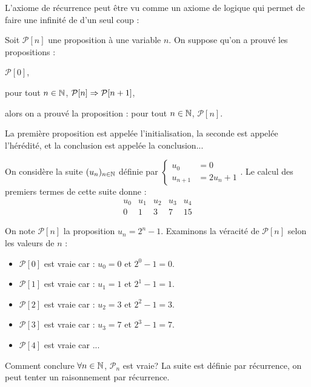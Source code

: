 \documentclass[a4paper,11pt,DIV20,BCOR0mm]{scrartcl}
\begin{document}
L'axiome de récurrence peut être vu comme un axiome de logique qui permet de faire une infinité de 
d'un seul coup :

\begin{axiome}
Soit $\mathcal{P}[n]$ une proposition à une variable $n$.
On suppose qu'on a prouvé les propositions :
\begin{description}
 \item $\mathcal{P}[0]$,
 \item pour tout $n\in\mathbb{N}$, $\mathcal{P}[n]\Rightarrow\mathcal{P}[n+1]$,
\end{description}
alors on a prouvé la proposition : \og pour tout $n\in\mathbb{N}$, $\mathcal{P}[n]$\fg.
\end{axiome}
La première proposition est appelée l'initialisation, la seconde est appelée l'hérédité,
et la conclusion est appelée la conclusion...
\begin{exemple}
	On considère la suite $(u_n)_{n\in\mathbb{N}}$ définie par $\left\{\begin{array}{ll}
	                                                u_0&=0\\
                                                  u_{n+1}&=2u_n+1
	                                                \end{array}\right.$. 
Le calcul des premiers termes de cette suite donne :
\[
 \begin{array}{c|c|c|c|c}
  u_0	&	u_1	&	u_2	&	u_3	&	u_4\\\hline
  0	&	1	&	3	&	7	&	15
 \end{array}
\]

On note $\mathcal{P}[n]$ la proposition \og$u_n=2^n-1$\fg. Examinons la véracité de $\mathcal{P}[n]$
selon les valeurs de $n$ :
\begin{itemize}
  \item $\mathcal{P}[0]$ est vraie car : $u_0 = 0$ et $2^0-1=0$.
  \item $\mathcal{P}[1]$ est vraie car : $u_1 = 1$ et $2^1-1=1$.
  \item $\mathcal{P}[2]$ est vraie car : $u_2 = 3$ et $2^2-1=3$.
  \item $\mathcal{P}[3]$ est vraie car : $u_3 = 7$ et $2^3-1=7$.
  \item $\mathcal{P}[4]$ est vraie car ...
\end{itemize}
Comment conclure \og$\forall n\in\mathbb{N}$, $\mathcal{P}_n$ est vraie\fg? La suite est définie par récurrence,
on peut tenter un raisonnement par récurrence.
\end{exemple}
\end{document}
